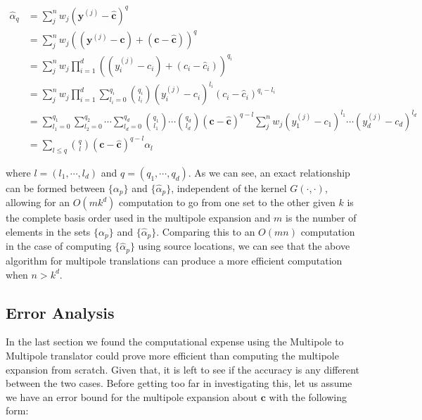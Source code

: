 \documentclass{article}[11pt]
\newcommand{\bvec}[1]{\boldsymbol{#1}}
\begin{document}
   \begin{align*}
    \hat{\alpha}_q &= \sum_j^n w_j \left(\bvec{y}^{(j)} - \bvec{\hat{c}}\right)^q \\
    &= \sum_j^n w_j \left( \left(\bvec{y}^{(j)} - \bvec{c}\right) +  \left(\bvec{c} - \bvec{\hat{c}}\right) \right)^q \\
    &= \sum_j^n w_j \prod_{i=1}^d \left( \left(y^{(j)}_i - c_i\right) +  \left(c_i - \hat{c}_i \right) \right)^{q_i} \\
    &= \sum_j^n w_j \prod_{i=1}^d \sum_{ l_i = 0 }^{q_i} \binom{q_i}{l_i} \left(y^{(j)}_i - c_i\right)^{l_i} \left(c_i - \hat{c}_i \right)^{q_i - l_i} \\
    &= \sum_{ l_1 = 0 }^{q_1} \sum_{ l_2 = 0 }^{q_2} \cdots \sum_{ l_d = 0 }^{q_d} \binom{q_1}{l_1} \cdots \binom{q_d}{l_d} \left(\bvec{c} - \bvec{\hat{c}} \right)^{q - l} \sum_j^n w_j \left(y^{(j)}_1 - c_1\right)^{l_1} \cdots \left(y^{(j)}_d - c_d\right)^{l_d} \\
    &= \sum_{ l \leq q } \binom{q}{l}\left(\bvec{c} - \bvec{\hat{c}} \right)^{q - l} \alpha_l
   \end{align*}

   where $l = \left(l_1, \cdots, l_d\right)$ and $q = \left(q_1, \cdots, q_d\right)$. As we can see, an exact relationship can be formed between $\lbrace \alpha_p \rbrace $ and $\lbrace \hat{\alpha}_p \rbrace$, independent of the kernel $G(\cdot, \cdot)$, allowing for an $O(m k^d)$ computation to go from one set to the other given $k$ is the complete basis order used in the multipole expansion and $m$ is the number of elements in the sets $\lbrace \alpha_p \rbrace $ and $\lbrace \hat{\alpha}_p \rbrace$. Comparing this to an $O(mn)$ computation in the case of computing $\lbrace \hat{\alpha}_p \rbrace$ using source locations, we can see that the above algorithm for multipole translations can produce a more efficient computation when $n > k^d$.

   \newpage
   \subsection{Error Analysis}
   In the last section we found the computational expense using the Multipole to Multipole translator could prove more efficient than computing the multipole expansion from scratch. Given that, it is left to see if the accuracy is any different between the two cases. Before getting too far in investigating this, let us assume we have an error bound for the multipole expansion about $\bvec{c}$ with the following form:
\end{document}
